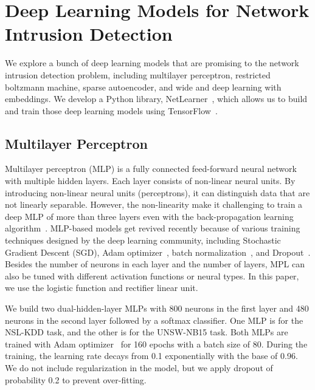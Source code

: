 \section{Deep Learning Models for Network Intrusion Detection}
\label{CDL:Sec:Architectures}

We explore a bunch of deep learning models that are promising to the
network intrusion detection problem, including multilayer perceptron, restricted boltzmann machine, sparse autoencoder, and wide and deep learning with embeddings. We develop a Python library, NetLearner~\cite{NetLearner}, which allows us to build and train those deep learning models using TensorFlow~\cite{TensorFlow}.

\subsection{Multilayer Perceptron}
\label{CDL:SubSec:MLP}
Multilayer perceptron (MLP) is a fully connected feed-forward neural network with multiple hidden layers.
Each layer consists of non-linear neural units.
By introducing non-linear neural units (perceptrons), it can distinguish data that are not linearly separable.
However, the non-linearity make it challenging to train a deep MLP of more than three layers even with the back-propagation learning algorithm~\cite{Backpropagation}.
MLP-based models get revived recently because of various training techniques designed by the deep learning community, including Stochastic Gradient Descent (SGD), Adam optimizer~\cite{Adam},
batch normalization~\cite{BatchNorm}, and Dropout~\cite{Dropout}.
Besides the number of neurons in each layer and the number of layers,
MPL can also be tuned with different activation functions or neural types.
In this paper, we use the logistic function and rectifier linear unit.

We build two dual-hidden-layer MLPs with 800 neurons in the first layer and 480 neurons in the second layer followed by a softmax classifier.
One MLP is for the NSL-KDD task, and the other is for the UNSW-NB15 task.
Both MLPs are trained with Adam optimizer~\cite{Adam} for 160 epochs with a batch size of 80.
During the training, the learning rate decays from 0.1 exponentially with the base of 0.96.
We do not include regularization in the model, but we apply dropout of probability 0.2 to prevent over-fitting.



